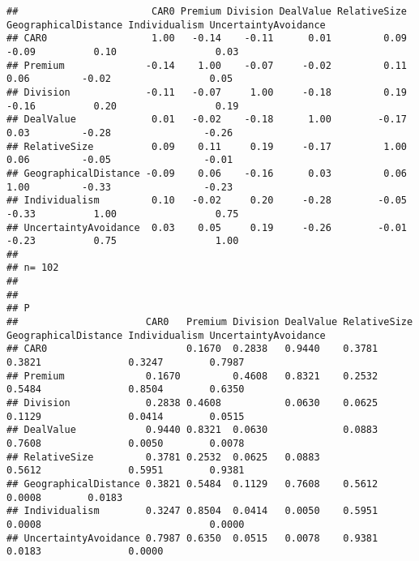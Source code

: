 \documentclass[]{article}
\begin{document}
\begin{verbatim}
##                       CAR0 Premium Division DealValue RelativeSize GeographicalDistance Individualism UncertaintyAvoidance
## CAR0                  1.00   -0.14    -0.11      0.01         0.09                -0.09          0.10                 0.03
## Premium              -0.14    1.00    -0.07     -0.02         0.11                 0.06         -0.02                 0.05
## Division             -0.11   -0.07     1.00     -0.18         0.19                -0.16          0.20                 0.19
## DealValue             0.01   -0.02    -0.18      1.00        -0.17                 0.03         -0.28                -0.26
## RelativeSize          0.09    0.11     0.19     -0.17         1.00                 0.06         -0.05                -0.01
## GeographicalDistance -0.09    0.06    -0.16      0.03         0.06                 1.00         -0.33                -0.23
## Individualism         0.10   -0.02     0.20     -0.28        -0.05                -0.33          1.00                 0.75
## UncertaintyAvoidance  0.03    0.05     0.19     -0.26        -0.01                -0.23          0.75                 1.00
## 
## n= 102 
## 
## 
## P
##                      CAR0   Premium Division DealValue RelativeSize GeographicalDistance Individualism UncertaintyAvoidance
## CAR0                        0.1670  0.2838   0.9440    0.3781       0.3821               0.3247        0.7987              
## Premium              0.1670         0.4608   0.8321    0.2532       0.5484               0.8504        0.6350              
## Division             0.2838 0.4608           0.0630    0.0625       0.1129               0.0414        0.0515              
## DealValue            0.9440 0.8321  0.0630             0.0883       0.7608               0.0050        0.0078              
## RelativeSize         0.3781 0.2532  0.0625   0.0883                 0.5612               0.5951        0.9381              
## GeographicalDistance 0.3821 0.5484  0.1129   0.7608    0.5612                            0.0008        0.0183              
## Individualism        0.3247 0.8504  0.0414   0.0050    0.5951       0.0008                             0.0000              
## UncertaintyAvoidance 0.7987 0.6350  0.0515   0.0078    0.9381       0.0183               0.0000
\end{verbatim}
\end{document}
